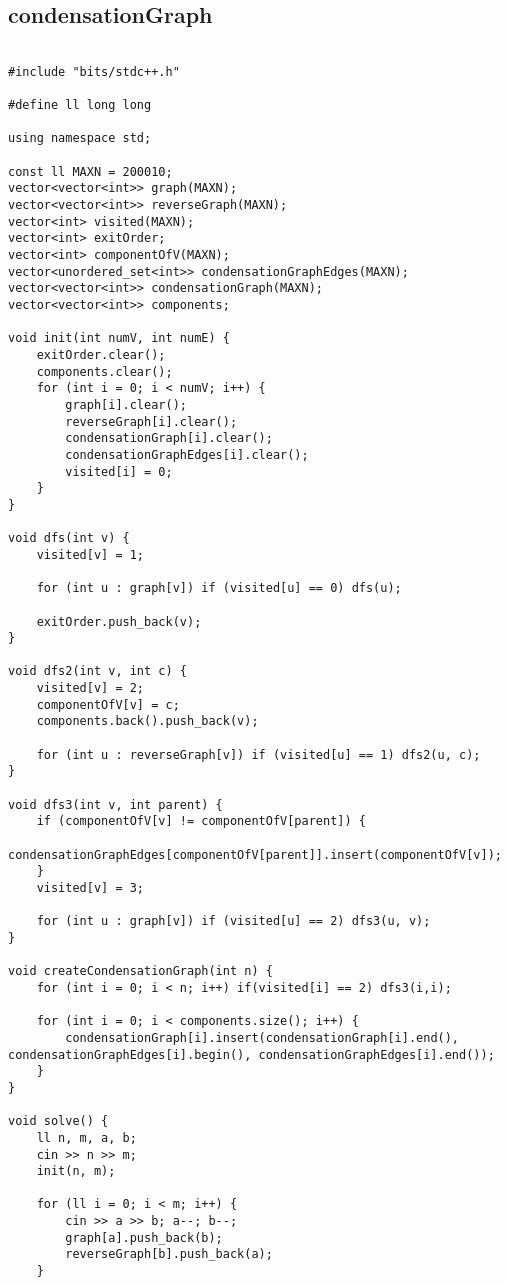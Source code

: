 \documentclass[landscape,twocolumn,10pt,a4paper]{article}
\begin{document}
\subsection{condensationGraph}
\begin{verbatim}

#include "bits/stdc++.h"

#define ll long long

using namespace std;

const ll MAXN = 200010;
vector<vector<int>> graph(MAXN);
vector<vector<int>> reverseGraph(MAXN);
vector<int> visited(MAXN);
vector<int> exitOrder;
vector<int> componentOfV(MAXN);
vector<unordered_set<int>> condensationGraphEdges(MAXN);
vector<vector<int>> condensationGraph(MAXN);
vector<vector<int>> components;

void init(int numV, int numE) {
    exitOrder.clear();
    components.clear();
    for (int i = 0; i < numV; i++) {
        graph[i].clear();
        reverseGraph[i].clear();
        condensationGraph[i].clear();
        condensationGraphEdges[i].clear();
        visited[i] = 0;
    }
}

void dfs(int v) {
    visited[v] = 1;

    for (int u : graph[v]) if (visited[u] == 0) dfs(u);

    exitOrder.push_back(v);
}

void dfs2(int v, int c) {
    visited[v] = 2;
    componentOfV[v] = c;
    components.back().push_back(v);

    for (int u : reverseGraph[v]) if (visited[u] == 1) dfs2(u, c);
}

void dfs3(int v, int parent) {
    if (componentOfV[v] != componentOfV[parent]) {
        condensationGraphEdges[componentOfV[parent]].insert(componentOfV[v]);
    }
    visited[v] = 3;

    for (int u : graph[v]) if (visited[u] == 2) dfs3(u, v);
}

void createCondensationGraph(int n) {
    for (int i = 0; i < n; i++) if(visited[i] == 2) dfs3(i,i);

    for (int i = 0; i < components.size(); i++) {
        condensationGraph[i].insert(condensationGraph[i].end(), condensationGraphEdges[i].begin(), condensationGraphEdges[i].end());
    }
}

void solve() {
    ll n, m, a, b;
    cin >> n >> m;
    init(n, m);

    for (ll i = 0; i < m; i++) {
        cin >> a >> b; a--; b--;
        graph[a].push_back(b);
        reverseGraph[b].push_back(a);
    }


\end{verbatim}
\end{document}
